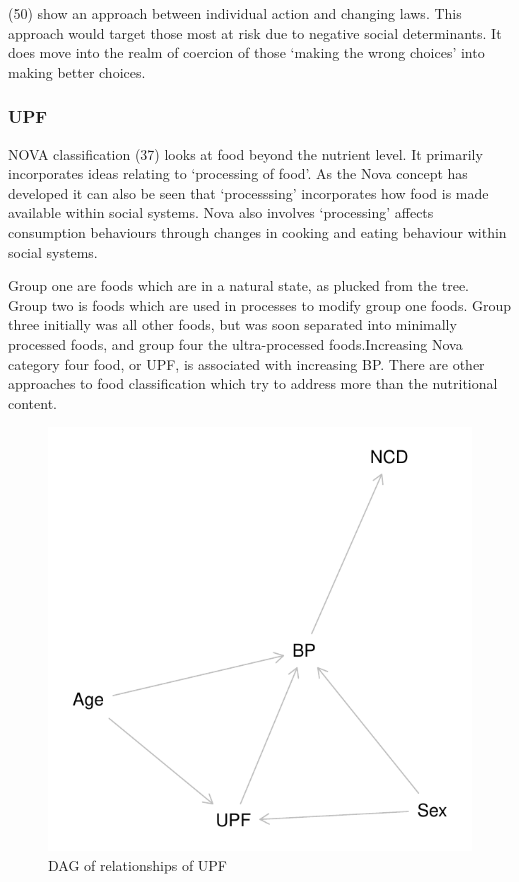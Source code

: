\documentclass[
]{article}
\begin{document}
(50) show an approach between individual action and changing laws. This
approach would target those most at risk due to negative social
determinants. It does move into the realm of coercion of those `making
the wrong choices' into making better choices.

\hypertarget{upf}{%
\subsubsection{UPF}\label{upf}}

NOVA classification (37) looks at food beyond the nutrient level. It
primarily incorporates ideas relating to `processing of food'. As the
Nova concept has developed it can also be seen that `processsing'
incorporates how food is made available within social systems. Nova also
involves `processing' affects consumption behaviours through changes in
cooking and eating behaviour within social systems.

Group one are foods which are in a natural state, as plucked from the
tree. Group two is foods which are used in processes to modify group one
foods. Group three initially was all other foods, but was soon separated
into minimally processed foods, and group four the ultra-processed
foods.Increasing Nova category four food, or UPF, is associated with
increasing BP. There are other approaches to food classification which
try to address more than the nutritional content.

\begin{figure}
\centering
\includegraphics{nextlevel_files/figure-latex/fig-dag-upf-1.pdf}
\caption{DAG of relationships of UPF}
\end{figure}
\end{document}
